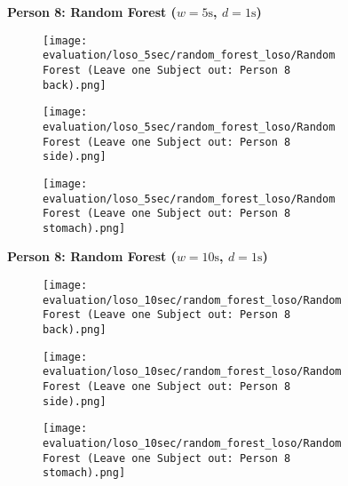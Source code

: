 \begin{figure}
    \textbf{Person 8: Random Forest ($w=5\si{\s}$, $d=1\si{\s}$)}
      \centering
      \begin{subfigure}{1\textwidth}
          \texttt{[image: evaluation/loso\_5sec/random\_forest\_loso/Random Forest (Leave one Subject out: Person 8 back).png]}
        \end{subfigure}
        \begin{subfigure}{1\textwidth}
          \texttt{[image: evaluation/loso\_5sec/random\_forest\_loso/Random Forest (Leave one Subject out: Person 8 side).png]}
        \end{subfigure}
        \begin{subfigure}{1\textwidth}
          \texttt{[image: evaluation/loso\_5sec/random\_forest\_loso/Random Forest (Leave one Subject out: Person 8 stomach).png]}
      \end{subfigure}
        \textbf{Person 8: Random Forest ($w=10\si{\s}$, $d=1\si{\s}$)}
      \centering
      \begin{subfigure}{1\textwidth}
          \texttt{[image: evaluation/loso\_10sec/random\_forest\_loso/Random Forest (Leave one Subject out: Person 8 back).png]}
        \end{subfigure}
        \begin{subfigure}{1\textwidth}
          \texttt{[image: evaluation/loso\_10sec/random\_forest\_loso/Random Forest (Leave one Subject out: Person 8 side).png]}
        \end{subfigure}
        \begin{subfigure}{1\textwidth}
          \texttt{[image: evaluation/loso\_10sec/random\_forest\_loso/Random Forest (Leave one Subject out: Person 8 stomach).png]}
      \end{subfigure}
  
      \label{evaluation:xgboost_loso:person6}
\end{figure}
